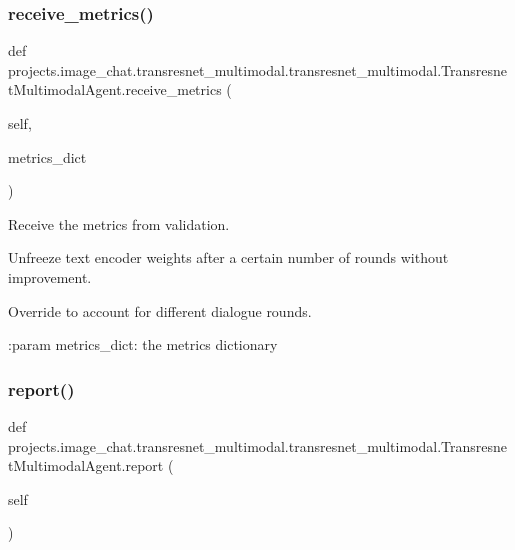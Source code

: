 \subsubsection{\texorpdfstring{receive\+\_\+metrics()}{receive\_metrics()}}
{\footnotesize\ttfamily def projects.\+image\+\_\+chat.\+transresnet\+\_\+multimodal.\+transresnet\+\_\+multimodal.\+Transresnet\+Multimodal\+Agent.\+receive\+\_\+metrics (\begin{DoxyParamCaption}\item[{}]{self,  }\item[{}]{metrics\+\_\+dict }\end{DoxyParamCaption})}

\begin{DoxyVerb}Receive the metrics from validation.

Unfreeze text encoder weights after a certain number of rounds without improvement.

Override to account for different dialogue rounds.

:param metrics_dict:
    the metrics dictionary
\end{DoxyVerb}
 \mbox{\label{classprojects_1_1image__chat_1_1transresnet__multimodal_1_1transresnet__multimodal_1_1TransresnetMultimodalAgent_a3fdcebd154e706f6d0ad6b2dd9fbdbbe}} 
\subsubsection{\texorpdfstring{report()}{report()}}
{\footnotesize\ttfamily def projects.\+image\+\_\+chat.\+transresnet\+\_\+multimodal.\+transresnet\+\_\+multimodal.\+Transresnet\+Multimodal\+Agent.\+report (\begin{DoxyParamCaption}\item[{}]{self }\end{DoxyParamCaption})}

